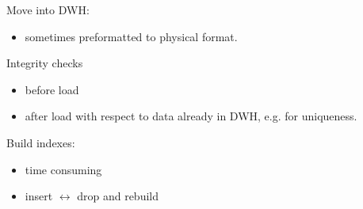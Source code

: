 \begin{breakbox}
\newline Move into DWH:
\begin{itemize}
	\item sometimes preformatted to physical format.
\end{itemize}
Integrity checks
\begin{itemize}
	\item before load
	\item after load with respect to data already in DWH, e.g. for uniqueness.
\end{itemize}
Build indexes:
\begin{itemize}
	\item time consuming
	\item insert $\leftrightarrow$ drop and rebuild
\end{itemize}
\end{breakbox}


















